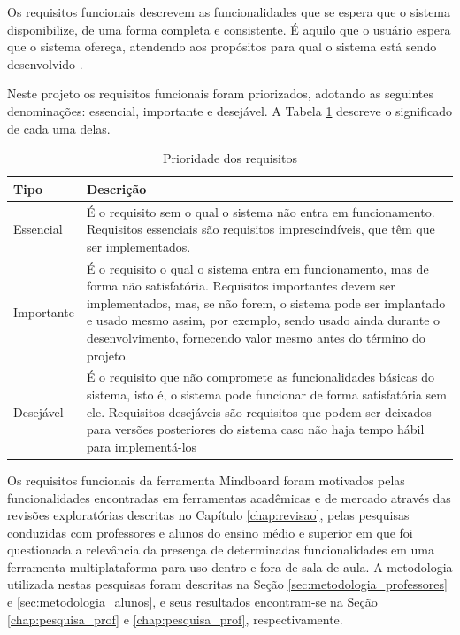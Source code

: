 Os requisitos funcionais descrevem as funcionalidades que se espera que o sistema disponibilize, de uma forma completa e consistente. É aquilo que o usuário espera que o sistema ofereça, atendendo aos propósitos para qual o sistema está sendo desenvolvido \cite{padua05}.

Neste projeto os requisitos funcionais foram priorizados, adotando as seguintes denominações: essencial, importante e desejável. A Tabela \ref{tab:prioridade_req} descreve o significado de cada uma delas.

\bgroup
\def\arraystretch{1.5} %
\begin{table}[h]{} %
\caption{Prioridade dos requisitos}
\centering
\begin{tabular}{ | p{3cm} | p{10cm}| } \hline
\textbf{Tipo} & \textbf{Descrição} \\ \hline
Essencial & É o requisito sem o qual o sistema não entra em funcionamento. Requisitos essenciais são requisitos imprescindíveis, que têm que ser implementados.  \\ \hline
Importante  & É o requisito o qual o sistema entra em funcionamento, mas de forma não satisfatória. Requisitos importantes devem ser implementados, mas, se não forem, o sistema pode ser implantado e usado mesmo assim, por exemplo, sendo usado ainda durante o desenvolvimento, fornecendo valor mesmo antes do término do projeto.  \\ \hline
Desejável  & É o requisito que não compromete as funcionalidades básicas do sistema, isto é, o sistema pode funcionar de forma satisfatória sem ele. Requisitos desejáveis são requisitos que podem ser deixados para versões posteriores do sistema caso não haja tempo hábil para implementá-los  \\ \hline
\end{tabular}
\label{tab:prioridade_req}
\end{table}
\egroup

Os requisitos funcionais da ferramenta Mindboard foram motivados pelas funcionalidades encontradas em ferramentas acadêmicas e de mercado através das revisões exploratórias descritas no Capítulo \ref{chap:revisao}, pelas pesquisas conduzidas com professores e alunos do ensino médio e superior em que foi questionada a relevância da presença de determinadas funcionalidades em uma ferramenta multiplataforma para uso dentro e fora de sala de aula. A metodologia utilizada nestas pesquisas foram descritas na Seção \ref{sec:metodologia_professores} e \ref{sec:metodologia_alunos}, e seus resultados encontram-se na Seção \ref{chap:pesquisa_prof} e \ref{chap:pesquisa_prof}, respectivamente. 

